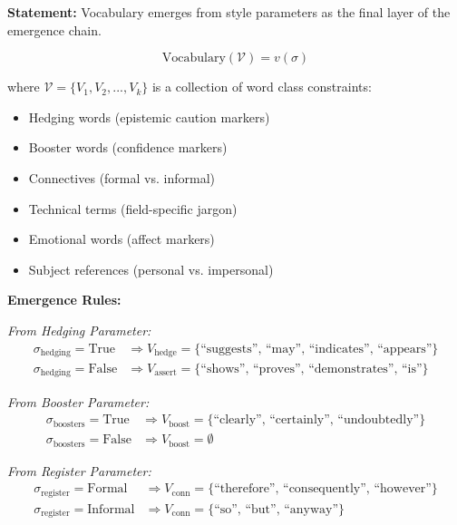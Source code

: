 \begin{tcolorbox}[colback=gray!5!white, colframe=gray!75!black,
    title=Axiom DT-9: Vocabulary Emergence]
\textbf{Statement:} Vocabulary emerges from style parameters as the final layer of
the emergence chain.

\begin{equation}
\text{Vocabulary}(\mathcal{V}) = v(\sigma)
\end{equation}

where $\mathcal{V} = \{V_1, V_2, ..., V_k\}$ is a collection of word class constraints:
\begin{itemize}[nosep]
\item Hedging words (epistemic caution markers)
\item Booster words (confidence markers)
\item Connectives (formal vs. informal)
\item Technical terms (field-specific jargon)
\item Emotional words (affect markers)
\item Subject references (personal vs. impersonal)
\end{itemize}

\textbf{Emergence Rules:}

\textit{From Hedging Parameter:}
\begin{align}
\sigma_{\text{hedging}} = \text{True} &\Rightarrow V_{\text{hedge}} = \{\text{``suggests'', ``may'', ``indicates'', ``appears''}\} \\
\sigma_{\text{hedging}} = \text{False} &\Rightarrow V_{\text{assert}} = \{\text{``shows'', ``proves'', ``demonstrates'', ``is''}\}
\end{align}

\textit{From Booster Parameter:}
\begin{align}
\sigma_{\text{boosters}} = \text{True} &\Rightarrow V_{\text{boost}} = \{\text{``clearly'', ``certainly'', ``undoubtedly''}\} \\
\sigma_{\text{boosters}} = \text{False} &\Rightarrow V_{\text{boost}} = \emptyset
\end{align}

\textit{From Register Parameter:}
\begin{align}
\sigma_{\text{register}} = \text{Formal} &\Rightarrow V_{\text{conn}} = \{\text{``therefore'', ``consequently'', ``however''}\} \\
\sigma_{\text{register}} = \text{Informal} &\Rightarrow V_{\text{conn}} = \{\text{``so'', ``but'', ``anyway''}\}
\end{align}


\end{tcolorbox}
